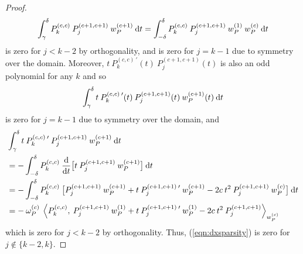 \documentclass[11pt, oneside]{article}   	%
\newcommand{\jac}{{P}}
\newcommand{\jacw}{w_P}
\newcommand{\normjac}{\omega_P}
\begin{document}
\begin{proof}
\begin{align*}
	\int_\gamma^\delta \jac_k^{(c,c)} \: \jac_j^{(c+1,c+1)} \: \jacw^{(c+1)} \: \D t = \int_{-\delta}^\delta \jac_k^{(c,c)} \: \jac_j^{(c+1,c+1)} \: \jacw^{(1)} \: \jacw^{(c)} \: \D t 
\end{align*}
is zero for $j < k - 2$ by orthogonality, and is zero for $j = k-1$ due to symmetry over the domain. Moreover, $t \: \jac_k^{(c,c) \: \prime}(t) \: \jac_j^{(c+1,c+1)}(t)$ is also an odd polynomial for any $k$ and so
\begin{align*}
	\int_\gamma^\delta t \: \jac_k^{(c,c) \: \prime}(t) \: \jac_j^{(c+1,c+1)}(t) \: \jacw^{(c+1)}(t) \: \D t
\end{align*}
is zero for $j = k-1$ due to symmetry over the domain, and
\begin{align*}
	&\int_\gamma^\delta t \: \jac_k^{(c,c) \: \prime} \: \jac_j^{(c+1,c+1)} \: \jacw^{(c+1)} \: \D t \\
	&= - \int_{-\delta}^\delta \jac_k^{(c,c)} \: \frac{\D}{\D t} \big[ t \: \jac_j^{(c+1,c+1)} \: \jacw^{(c+1)} \big] \: \D t \\
	&= - \int_{-\delta}^\delta \jac_k^{(c,c)} \: \big[ \jac_j^{(c+1,c+1)} \: \jacw^{(c+1)} + t \: \jac_j^{(c+1,c+1) \: \prime} \: \jacw^{(c+1)} - 2 c \: t^2 \: \jac_j^{(c+1,c+1)} \: \jacw^{(c)} \big] \: \D t \\
	&= - \: \normjac^{(c)} \: \ip< \jac_k^{(c,c)}, \: \jac_j^{(c+1,c+1)} \: \jacw^{(1)} + t \: \jac_{j}^{(c+1,c+1) \: \prime} \: \jacw^{(1)} - 2c \: t^2 \: \jac_{j}^{(c+1,c+1)}  >_{\jacw^{(c)}}
\end{align*}
which is zero for $j < k - 2$ by orthogonality. Thus, (\ref{eqn:dxsparsity}) is zero for $j \notin \{k-2, k\}$.


\end{proof}
\end{document}
